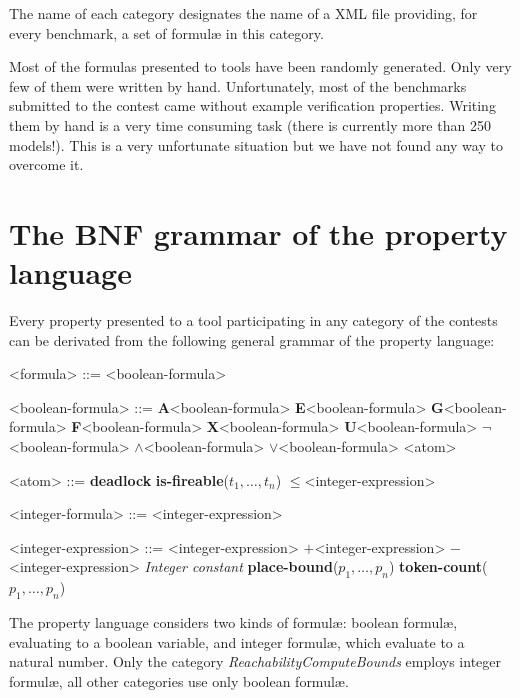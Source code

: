\documentclass[10pt,english,a4paper]{article}
\newcommand\ctla             {\textbf{A}\xspace}
\newcommand\ctle             {\textbf{E}\xspace}
\newcommand\ltlf             {\textbf{F}\xspace}
\newcommand\ltlg             {\textbf{G}\xspace}
\newcommand\ltlx             {\textbf{X}\xspace}
\newcommand\ltlu             {\textbf{U}\xspace}
\newcommand\logicnot         {\boldmath$\lnot$\xspace}
\newcommand\logicand         {\boldmath$\land$\xspace}
\newcommand\logicor          {\boldmath$\lor$\xspace}
\newcommand\atomleq          {\boldmath$\leq$\xspace}
\newcommand\atomdead         {\textbf{deadlock}\xspace}
\newcommand\atomisfire[1]    {\textbf{is-fireable}(#1)}
\newcommand\atomplacebnd[1]  {\textbf{place-bound}(#1)}
\newcommand\atomtokenscnt[1] {\textbf{token-count}(#1)}
\newcommand\exprplus         {\boldmath$+$\xspace}
\newcommand\exprminus        {\boldmath$-$\xspace}
\begin{document}
The name of each category designates the
name of a XML file providing, for every benchmark, a set of formulæ in
this category.


Most of the formulas presented to tools have been randomly generated.
Only very few of them were written by hand.
Unfortunately, most of the benchmarks submitted to the contest came without
example verification properties.
Writing them by hand is a very time consuming task (there is currently more
than 250 models!).
This is a very unfortunate situation but we have not found any way to
overcome it.


\section{The BNF grammar of the property language}
\label{s:bnf}

Every property presented to a tool participating in any category of the
contests can be derivated from the following general grammar of the
property language:

\begin{grammar}
<formula> ::= <boolean-formula>

<boolean-formula> ::= \ctla <boolean-formula>
\alt \ctle <boolean-formula>
\alt \ltlg <boolean-formula>
\alt \ltlf <boolean-formula>
\alt \ltlx <boolean-formula>
 \ltlu <boolean-formula>
\alt \logicnot <boolean-formula>
 \logicand <boolean-formula>
 \logicor <boolean-formula>
\alt <atom>

<atom> ::= \atomdead
\alt \atomisfire{$t_1, \ldots, t_n$}
 \atomleq <integer-expression>

<integer-formula> ::= <integer-expression>

<integer-expression> ::=
     <integer-expression> \exprplus <integer-expression>
 \exprminus <integer-expression>
\alt \textit{Integer constant}
\alt \atomplacebnd{$p_1, \ldots, p_n$}
\alt \atomtokenscnt{$p_1, \ldots, p_n$}

\end{grammar}

The property language considers two kinds of formul\ae{}:
boolean formul\ae{},
evaluating to a boolean variable, and integer formul\ae{},
which evaluate to a natural number.
Only the category
\textit{ReachabilityComputeBounds} employs integer formul\ae{}, all other
categories use only boolean formul\ae{}.
\end{document}
